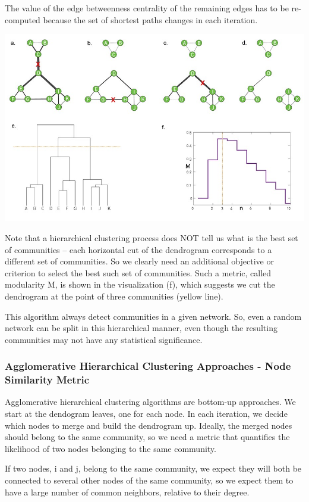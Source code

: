 \documentclass[11pt]{scrartcl} %
\begin{document}
The value of the edge betweenness centrality of the remaining edges has to be re-computed because the set of shortest paths changes in each iteration.

\includegraphics[width=0.9\linewidth]{img/L7.1-DivisiveHierarchicalCommunityDetection.jpg}

Note that a hierarchical clustering process does NOT tell us what is the best set of communities – each horizontal cut of the dendrogram corresponds to a different set of communities. So we clearly need an additional objective or criterion to select the best such set of communities. Such a metric, called modularity M, is shown in the visualization (f), which suggests we cut the dendrogram at the point of three communities (yellow line).

This algorithm always detect communities in a given network. So, even a random network can be split in this hierarchical manner, even though the resulting communities may not have any statistical significance.    

\subsubsection{Agglomerative Hierarchical Clustering Approaches - Node Similarity Metric}
Agglomerative hierarchical clustering algorithms are bottom-up approaches. We start at the dendogram leaves, one for each node. In each iteration, we decide which nodes to merge and build the dendrogram up. Ideally, the merged nodes should belong to the same community, so we need a metric that quantifies the likelihood of two nodes belonging to the same community.

If two nodes, i and j, belong to the same community, we expect they will both be connected to several other nodes of the same community, so we expect them to have a large number of common neighbors, relative to their degree.
\end{document}

